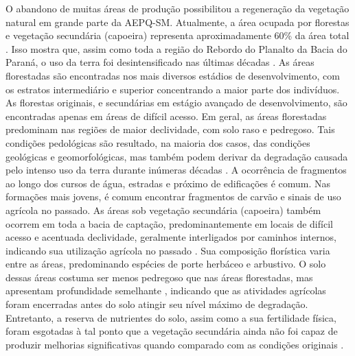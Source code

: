 \documentclass[final]{article}
\begin{document}

O abandono de muitas áreas de produção possibilitou a regeneração da vegetação natural em grande parte da AEPQ-SM. Atualmente, a área ocupada por florestas e vegetação secundária (capoeira) representa aproximadamente 60\% da área total \cite{SamuelRosaEtAl2011a}. Isso mostra que, assim como toda a região do Rebordo do Planalto da Bacia do Paraná, o uso da terra foi desintensificado nas últimas décadas \cite{SEMA/UFSM2001, DillEtAl2004, Poelking2007, Miguel2010, SamuelRosaEtAl2011a, Dullius2012, tenCatenEtAl2012}. As áreas florestadas são encontradas nos mais diversos estádios de desenvolvimento, com os estratos intermediário e superior concentrando a maior parte dos indivíduos. As florestas originais, e secundárias em estágio avançado de desenvolvimento, são encontradas apenas em áreas de difícil acesso. Em geral, as áreas florestadas predominam nas regiões de maior declividade, com solo raso e pedregoso. Tais condições pedológicas são resultado, na maioria dos casos, das condições geológicas e geomorfológicas, mas também podem derivar da degradação causada pelo intenso uso da terra durante inúmeras décadas \cite{SamuelRosaEtAl2011a}. A ocorrência de fragmentos ao longo dos cursos de água, estradas e próximo de edificações é comum. Nas formações mais jovens, é comum encontrar fragmentos de carvão e sinais de uso agrícola no passado. As áreas sob vegetação secundária (capoeira) também ocorrem em toda a bacia de captação, predominantemente em locais de difícil acesso e acentuada declividade, geralmente interligados por caminhos internos, indicando sua utilização agrícola no passado \cite{SamuelRosaEtAl2011a}. Sua composição florística varia entre as áreas, predominando espécies de porte herbáceo e arbustivo. O solo dessas áreas costuma ser menos pedregoso que nas áreas florestadas, mas apresentam profundidade semelhante \cite{SamuelRosaEtAl2011a}, indicando que as atividades agrícolas foram encerradas antes do solo atingir seu nível máximo de degradação. Entretanto, a reserva de nutrientes do solo, assim como a sua fertilidade física, foram esgotadas à tal ponto que a vegetação secundária ainda não foi capaz de produzir melhorias significativas quando comparado com as condições originais \cite{Menezes2008, Zalamena2008}.
\end{document}
